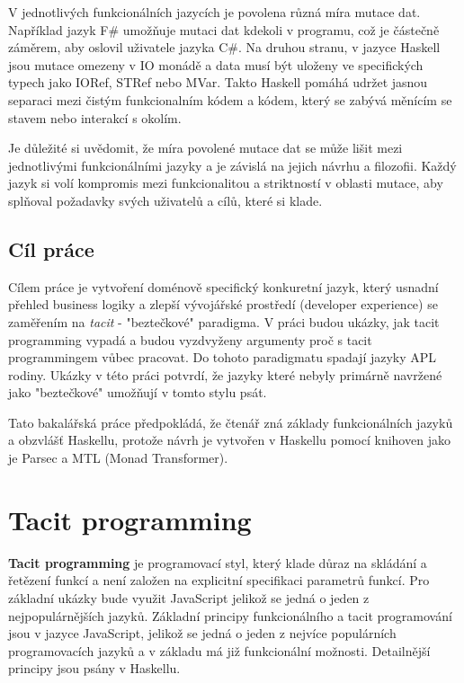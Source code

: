 \documentclass[male,czech]{kithesis}
\begin{document}
V jednotlivých funkcionálních jazycích je povolena různá míra mutace dat. 
Například jazyk F\# umožňuje mutaci dat kdekoli v programu, což je částečně záměrem, 
aby oslovil uživatele jazyka C\#. Na druhou stranu, 
v jazyce Haskell jsou mutace omezeny v IO monádě a data musí být uloženy 
ve specifických typech jako IORef, STRef nebo MVar. Takto Haskell 
pomáhá udržet jasnou separaci mezi čistým funkcionalním kódem a kódem, 
který se zabývá měnícím se stavem nebo interakcí s okolím.


Je důležité si uvědomit, že míra povolené mutace dat se může lišit mezi jednotlivými funkcionálními jazyky a je závislá na jejich návrhu a filozofii. Každý jazyk si volí kompromis mezi funkcionalitou a striktností v oblasti mutace, aby splňoval požadavky svých uživatelů a cílů, které si klade.

\section{Cíl práce}

Cílem práce je vytvoření doménově specifický konkuretní jazyk, který usnadní přehled business logiky a zlepší 
vývojářské prostředí (developer experience) se zaměřením na \textit{tacit} - "beztečkové" paradigma.
V práci budou ukázky, jak
tacit programming vypadá a budou vyzdvyženy argumenty proč s tacit programmingem
vůbec pracovat.
Do tohoto paradigmatu spadají jazyky APL rodiny. 
Ukázky v této práci potvrdí, že jazyky které nebyly primárně navržené jako "beztečkové" 
umožňují v tomto stylu psát.

Tato bakalářská práce předpokládá, že čtenář zná základy funkcionálních jazyků a obzvlášť Haskellu, 
protože návrh je vytvořen v Haskellu pomocí knihoven jako je Parsec a MTL (Monad Transformer).

\chapter{Tacit programming}

\textbf{Tacit programming} je programovací styl, 
který klade důraz na skládání a řetězení funkcí a není založen na explicitní specifikaci parametrů funkcí.
Pro základní ukázky bude využit JavaScript jelikož se jedná o jeden z nejpopulárnějších jazyků. 
Základní principy funkcionálního a tacit programování jsou v jazyce JavaScript,
jelikož se jedná o jeden z nejvíce populárních programovacích jazyků a v základu má již funkcionální možnosti.
Detailnější principy jsou psány v Haskellu.
\end{document}
